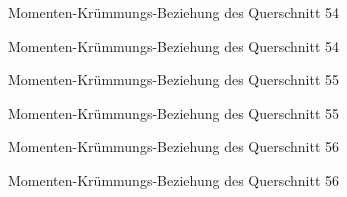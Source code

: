 \documentclass[
  11pt,
  letterpaper,
]{scrreprt}
\begin{document}
\begin{figure}[H]


\caption{\label{fig-qs_54}Momenten-Krümmungs-Beziehung des Querschnitt
54}

\end{figure}%

\begin{figure}[H]


\caption{\label{fig-m_chi_54}Momenten-Krümmungs-Beziehung des
Querschnitt 54}

\end{figure}%

\begin{figure}[H]


\caption{\label{fig-qs_55}Momenten-Krümmungs-Beziehung des Querschnitt
55}

\end{figure}%

\begin{figure}[H]


\caption{\label{fig-m_chi_55}Momenten-Krümmungs-Beziehung des
Querschnitt 55}

\end{figure}%

\begin{figure}[H]


\caption{\label{fig-qs_56}Momenten-Krümmungs-Beziehung des Querschnitt
56}

\end{figure}%

\begin{figure}[H]


\caption{\label{fig-m_chi_56}Momenten-Krümmungs-Beziehung des
Querschnitt 56}

\end{figure}%
\end{document}
